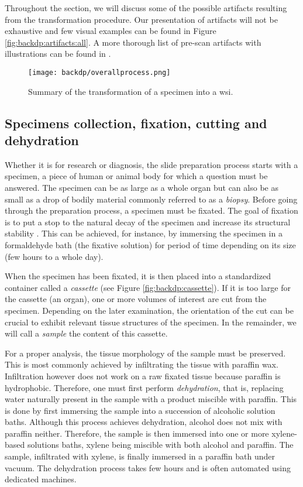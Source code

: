 Throughout the section, we will discuss some of the possible artifacts resulting from the transformation procedure. Our presentation of artifacts will not be exhaustive and few visual examples can be found in Figure \ref{fig:backdp:artifacts:all}. A more thorough list of pre-scan artifacts with illustrations can be found in \cite{taqi2018review}.

\begin{figure}
  \centering
  \texttt{[image: backdp/overallprocess.png]}
  \caption{Summary of the transformation of a specimen into a \acrlong{wsi}.}
  \label{fig:backdp:overallprocess}
\end{figure}

\subsection{Specimens collection, fixation, cutting and dehydration}

Whether it is for research or diagnosis, the slide preparation process starts with a specimen, a piece of human or animal body for which a question must be answered. The specimen can be as large as a whole organ but can also be as small as a drop of bodily material commonly referred to as a \textit{biopsy}. Before going through the preparation process, a specimen must be fixated. The goal of fixation is to put a stop to the natural decay of the specimen and increase its structural stability \cite{rolls2012process}. This can be achieved, for instance, by immersing the specimen in a formaldehyde bath (\ie the fixative solution) for period of time depending on its size (\ie few hours to a whole day). 

When the specimen has been fixated, it is then placed into a standardized container called a \textit{cassette} (see Figure \ref{fig:backdp:cassette}). If it is too large for the cassette (\eg an organ), one or more volumes of interest are cut from the specimen. Depending on the later examination, the orientation of the cut can be crucial to exhibit relevant tissue structures of the specimen. In the remainder, we will call a \textit{sample} the content of this cassette.

For a proper analysis, the tissue morphology of the sample must be preserved. This is most commonly achieved by infiltrating the tissue with paraffin wax. Infiltration however does not work on a raw fixated tissue because paraffin is hydrophobic. Therefore, one must first perform \textit{dehydration}, that is, replacing water naturally present in the sample with a product miscible with paraffin. This is done by first immersing the sample into a succession of alcoholic solution baths. Although this process achieves dehydration, alcohol does not mix with paraffin neither. Therefore, the sample is then immersed into one or more xylene-based solutions baths, xylene being miscible with both alcohol and paraffin. The sample, infiltrated with xylene, is finally immersed in a paraffin bath under vacuum. The dehydration process takes few hours and is often automated using dedicated machines.

